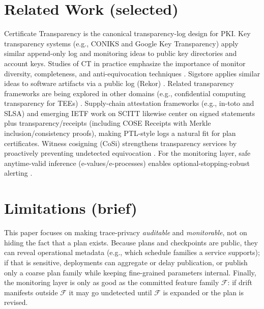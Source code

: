 \documentclass[11pt]{article}
\begin{document}
\section{Related Work (selected)}
Certificate Transparency \cite{rfc6962,rfc9162} is the canonical transparency-log design for PKI.
Key transparency systems (e.g., CONIKS and Google Key Transparency) apply similar append-only log and monitoring ideas to public key directories and account keys.\cite{coniks2015,keyTransparencyGoogle}
Studies of CT in practice emphasize the importance of monitor diversity, completeness, and anti-equivocation techniques \cite{liCTInWild2019,sunCTMonitorsNDSS2024,dahlbergAggCTGossip2019}.
Sigstore applies similar ideas to software artifacts via a public log (Rekor) \cite{newmanSigstore2022,rekorDocs}. Related transparency frameworks are being explored in other domains (e.g., confidential computing transparency for TEEs) \cite{cctTransparency2024}.
Supply-chain attestation frameworks (e.g., in-toto and SLSA) and emerging IETF work on SCITT likewise center on signed statements plus transparency/receipts (including COSE Receipts with Merkle inclusion/consistency proofs), making PTL-style logs a natural fit for plan certificates.\cite{torresAriasInToto2019,slsaSpecV12,scittArchitectureDraft2025,scittWGAbout2026,scittReceiptsCcfProfile2026,coseMerkleTreeProofs2025}
Witness cosigning (CoSi) strengthens transparency services by proactively preventing undetected equivocation \cite{sytaCoSi2016}.
For the monitoring layer, safe anytime-valid inference (e-values/e-processes) enables optional-stopping-robust alerting \cite{ramdasSAVIStatSci2023,shaferTestingByBetting,ramdasEvaluesEbook2025}.

\section{Limitations (brief)}
\label{sec:c2limitations}
This paper focuses on making trace-privacy \emph{auditable} and \emph{monitorable}, not on hiding the fact that a plan exists.
Because plans and checkpoints are public, they can reveal operational metadata (e.g., which schedule families a service supports); if that is sensitive, deployments can aggregate or delay publication, or publish only a coarse plan family while keeping fine-grained parameters internal.
Finally, the monitoring layer is only as good as the committed feature family $\mathcal{F}$: if drift manifests outside $\mathcal{F}$ it may go undetected until $\mathcal{F}$ is expanded or the plan is revised.
\end{document}
